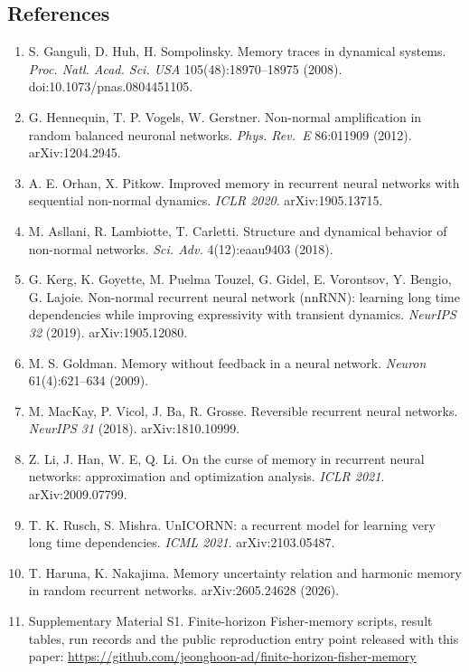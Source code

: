 \documentclass[
  10pt,
]{article}
\begin{document}
\subsection{References}\label{references}

\begin{enumerate}
\def\labelenumi{\arabic{enumi}.}
\item
  S. Ganguli, D. Huh, H. Sompolinsky. Memory traces in dynamical
  systems. \emph{Proc. Natl. Acad. Sci. USA} 105(48):18970--18975
  (2008). doi:10.1073/pnas.0804451105.
\item
  G. Hennequin, T. P. Vogels, W. Gerstner. Non-normal amplification in
  random balanced neuronal networks. \emph{Phys. Rev.~E} 86:011909
  (2012). arXiv:1204.2945.
\item
  A. E. Orhan, X. Pitkow. Improved memory in recurrent neural networks
  with sequential non-normal dynamics. \emph{ICLR 2020}.
  arXiv:1905.13715.
\item
  M. Asllani, R. Lambiotte, T. Carletti. Structure and dynamical
  behavior of non-normal networks. \emph{Sci. Adv.} 4(12):eaau9403
  (2018).
\item
  G. Kerg, K. Goyette, M. Puelma Touzel, G. Gidel, E. Vorontsov, Y.
  Bengio, G. Lajoie. Non-normal recurrent neural network (nnRNN):
  learning long time dependencies while improving expressivity with
  transient dynamics. \emph{NeurIPS 32} (2019). arXiv:1905.12080.
\item
  M. S. Goldman. Memory without feedback in a neural network.
  \emph{Neuron} 61(4):621--634 (2009).
\item
  M. MacKay, P. Vicol, J. Ba, R. Grosse. Reversible recurrent neural
  networks. \emph{NeurIPS 31} (2018). arXiv:1810.10999.
\item
  Z. Li, J. Han, W. E, Q. Li. On the curse of memory in recurrent neural
  networks: approximation and optimization analysis. \emph{ICLR 2021}.
  arXiv:2009.07799.
\item
  T. K. Rusch, S. Mishra. UnICORNN: a recurrent model for learning very
  long time dependencies. \emph{ICML 2021}. arXiv:2103.05487.
\item
  T. Haruna, K. Nakajima. Memory uncertainty relation and harmonic
  memory in random recurrent networks. arXiv:2605.24628 (2026).
\item
  Supplementary Material S1. Finite-horizon Fisher-memory scripts,
  result tables, run records and the public reproduction entry point
  released with this paper:
  \url{https://github.com/jeonghoon-ad/finite-horizon-fisher-memory}

\end{enumerate}
\end{document}
